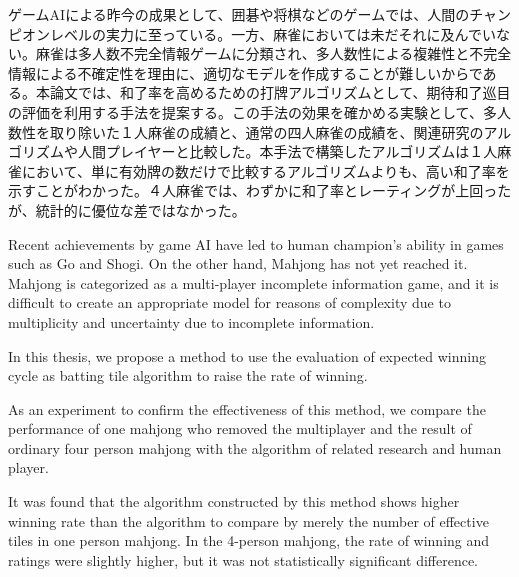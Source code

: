 
\begin{jabstract}

ゲームAIによる昨今の成果として、囲碁や将棋などのゲームでは、人間のチャンピオンレベルの実力に至っている。一方、麻雀においては未だそれに及んでいない。麻雀は多人数不完全情報ゲームに分類され、多人数性による複雑性と不完全情報による不確定性を理由に、適切なモデルを作成することが難しいからである。本論文では、和了率を高めるための打牌アルゴリズムとして、期待和了巡目の評価を利用する手法を提案する。この手法の効果を確かめる実験として、多人数性を取り除いた１人麻雀の成績と、通常の四人麻雀の成績を、関連研究のアルゴリズムや人間プレイヤーと比較した。本手法で構築したアルゴリズムは１人麻雀において、単に有効牌の数だけで比較するアルゴリズムよりも、高い和了率を示すことがわかった。４人麻雀では、わずかに和了率とレーティングが上回ったが、統計的に優位な差ではなかった。


\end{jabstract}


\begin{eabstract}

Recent achievements by game AI have led to human champion's ability in games such as Go and Shogi. On the other hand, Mahjong has not yet reached it. Mahjong is categorized as a multi-player incomplete information game, and it is difficult to create an appropriate model for reasons of complexity due to multiplicity and uncertainty due to incomplete information.

In this thesis, we propose a method to use the evaluation of expected winning cycle as batting tile algorithm to raise the rate of winning.

As an experiment to confirm the effectiveness of this method, we compare the performance of one mahjong who removed the multiplayer and the result of ordinary four person mahjong with the algorithm of related research and human player.

It was found that the algorithm constructed by this method shows higher winning rate than the algorithm to compare by merely the number of effective tiles in one person mahjong. In the 4-person mahjong, the rate of winning and ratings were slightly higher, but it was not statistically significant difference.

\end{eabstract}
